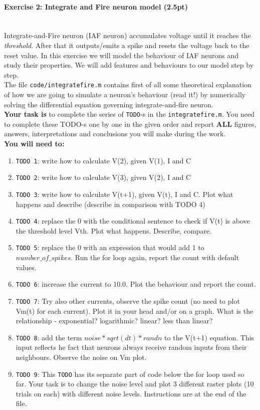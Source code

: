 \documentclass[a4paper,11pt]{article}
\newenvironment{exercise}[3]{\paragraph{Exercise #1: #2 (#3pt)}\ \\}{
\medskip}
\begin{document}
%
%
\begin{exercise}{2}{Integrate and Fire neuron model}{2.5}

Integrate-and-Fire neuron (IAF neuron) accumulates voltage until it reaches the \emph{threshold}. After that it outputs/emits a spike and resets the voltage back to the reset value. In this exercise we will model the behaviour of IAF neurons and study their properties. We will add features and behaviours to our model step by step. \\ 

The file \texttt{code/integratefire.m} contains first of all some theoretical explanation of how we are going to simulate a neuron's behaviour (read it!) by numerically solving the differential equation governing integrate-and-fire neuron.\\ \textbf{Your task is} to complete the series of \texttt{TODO}-s in the \texttt{integratefire.m}. You need to complete these TODO-s one by one in the given order and report \textbf{ALL} figures, answers, interpretations and conclusions you will make during the work.\\

\textbf{You will need to:}\\
\begin{enumerate}
\item \texttt{TODO 1}: write how to calculate V(2), given V(1), I and C
\item \texttt{TODO 2}: write how to calculate V(3), given V(2), I and C
\item \texttt{TODO 3}: write how to calculate V(t+1), given V(t), I and C. Plot what happens and describe (describe in comparison with TODO 4)
\item \texttt{TODO 4}: replace the 0 with the conditional sentence to check if V(t) is above the threshold level Vth. Plot what happens. Describe, compare.
\item \texttt{TODO 5}: replace the 0 with an expression that would add 1 to $number\_of\_spikes$. Run the for loop again, report the count with default values.
\item \texttt{TODO 6}: increase the current to 10.0. Plot the behaviour and report the count.
\item \texttt{TODO 7}: Try also other currents, observe the spike count (no need to plot Vm(t) for each current). Plot it in your head and/or on a graph. What is the relationship - exponential? logarithmic? linear? less than linear?
\item \texttt{TODO 8}: add the term $noise*sqrt(dt)*randn $ to the V(t+1) equation. This input reflects he fact that neurons always receive random inputs from their neighbours. Observe the noise on Vm plot.
\item \texttt{TODO 9}: This \texttt{TODO} has its separate part of code below the for loop used so far. Your task is to change the noise level and plot 3 different raster plots (10 trials on each) with different noise levels. Instructions are at the end of the file.
\end{enumerate}


\end{exercise}
\end{document}
